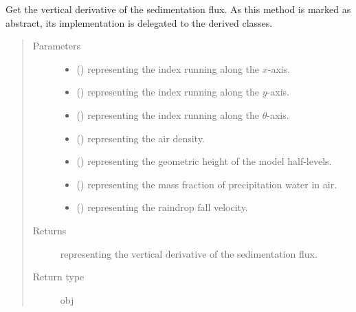 \documentclass[letterpaper,10pt,english]{sphinxmanual}
\begin{document}
\begin{fulllineitems}
\begin{fulllineitems}
\label{\detokenize{api:dycore.flux_sedimentation.FluxSedimentation.get_vertical_derivative_of_sedimentation_flux}}
Get the vertical derivative of the sedimentation flux.
As this method is marked as abstract, its implementation is delegated to the derived classes.
\begin{quote}\begin{description}
\item[{Parameters}] \leavevmode\begin{itemize}
\item {} 
 () \textendash{}  representing the index running along the \(x\)-axis.

\item {} 
 () \textendash{}  representing the index running along the \(y\)-axis.

\item {} 
 () \textendash{}  representing the index running along the \(\theta\)-axis.

\item {} 
 () \textendash{}  representing the air density.

\item {} 
 () \textendash{}  representing the geometric height of the model half-levels.

\item {} 
 () \textendash{}  representing the mass fraction of precipitation water in air.

\item {} 
 () \textendash{}  representing the raindrop fall velocity.

\end{itemize}

\item[{Returns}] \leavevmode
{} representing the vertical derivative of the sedimentation flux.

\item[{Return type}] \leavevmode
obj

\end{description}\end{quote}

\end{fulllineitems}


\end{fulllineitems}
\end{document}
